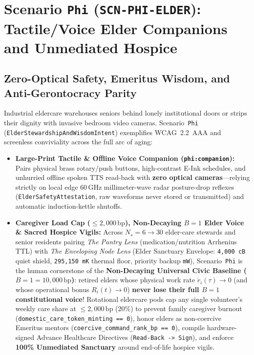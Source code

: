 \section{Scenario \texttt{Phi} (\texttt{SCN-PHI-ELDER}): Tactile/Voice Elder Companions and Unmediated Hospice}
\label{sec:wave-f-phi}

\subsection{Zero-Optical Safety, Emeritus Wisdom, and Anti-Gerontocracy Parity}

Industrial eldercare warehouses seniors behind lonely institutional doors or strips their dignity with invasive bedroom video cameras. Scenario~\texttt{Phi} (\texttt{ElderStewardshipAndWisdomIntent}) exemplifies WCAG~2.2~AAA and screenless conviviality across the full arc of aging:
\begin{itemize}
    \item \textbf{Large-Print Tactile \& Offline Voice Companion (\texttt{phi:companion}):} Pairs physical brass rotary/push buttons, high-contrast E-Ink schedules, and unhurried offline spoken TTS read-back with \textbf{zero optical cameras}---relying strictly on local edge $60\,\mathrm{GHz}$ millimeter-wave radar posture-drop reflexes (\texttt{ElderSafetyAttestation}, raw waveforms never stored or transmitted) and automatic induction-kettle shutoffs.
    \item \textbf{Caregiver Load Cap ($\le 2{,}000\,\mathrm{bp}$), Non-Decaying $B=1$ Elder Voice \& Sacred Hospice Vigils:} Across $N_s = 6 \to 30$ elder-care stewards and senior residents pairing \textit{The Pantry Lens} (medication/nutrition Arrhenius TTL) with \textit{The Enveloping Node Lens} (Elder Sanctuary Envelope: \texttt{4,000 cB} quiet shield, \texttt{295,150 mK} thermal floor, priority backup \texttt{mW}), Scenario~\texttt{Phi} is the human cornerstone of the \textbf{Non-Decaying Universal Civic Baseline ($B = 1 = 10{,}000\,\mathrm{bp}$)}: retired elders whose physical work rate $\dot{r}_i(\tau) \to 0$ (and whose operational bonus $R_i(t) \to 0$) \textbf{never lose their full $B = 1$ constitutional voice}! Rotational eldercare pods cap any single volunteer's weekly care share at $\le 2{,}000\,\mathrm{bp}$ ($20\%$) to prevent family caregiver burnout (\texttt{domestic\_care\_token\_minting == 0}), honor elders as non-coercive Emeritus mentors (\texttt{coercive\_command\_rank\_bp == 0}), compile hardware-signed Advance Healthcare Directives (\texttt{Read-Back -> Sign}), and enforce \textbf{100\% Unmediated Sanctuary} around end-of-life hospice vigils.
\end{itemize}

